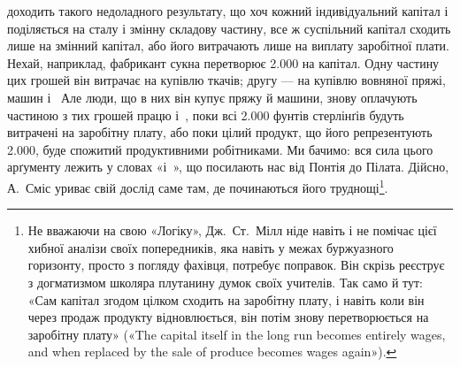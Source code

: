 доходить такого недоладного результату, що хоч кожний індивідуальний
капітал і поділяється на сталу і змінну складову
частину, все ж суспільний капітал сходить лише на змінний
капітал, або його витрачають лише на виплату заробітної плати.
Нехай, наприклад, фабрикант сукна перетворює \num{2.000}
на капітал. Одну частину цих грошей він витрачає на купівлю
ткачів; другу — на купівлю вовняної пряжі, машин і~
Але люди, що в них він купує пряжу й машини, знову оплачують
частиною з тих грошей працю і~, поки всі \num{2.000} фунтів
стерлінґів будуть витрачені на заробітну плату, або поки
цілий продукт, що його репрезентують \num{2.000},
буде спожитий продуктивними робітниками. Ми бачимо: вся
сила цього арґументу лежить у словах «і~», що посилають
нас від Понтія до Пілата. Дійсно, А.~Сміс уриває свій дослід
саме там, де починаються його труднощі\footnote{
Не вважаючи на свою «Логіку», Дж.~Ст.~Мілл ніде навіть і не
помічає цієї хибної аналізи своїх попередників, яка навіть у межах буржуазного
горизонту, просто з погляду фахівця, потребує поправок. Він
скрізь реєструє з догматизмом школяра плутанину думок своїх учителів.
Так само й тут: «Сам капітал згодом цілком сходить на заробітну плату,
і навіть коли він через продаж продукту відновлюється, він потім знову
перетворюється на заробітну плату» («The capital itself in the long run
becomes entirely wages, and when replaced by the sale of produce becomes
wages again»).
}.

